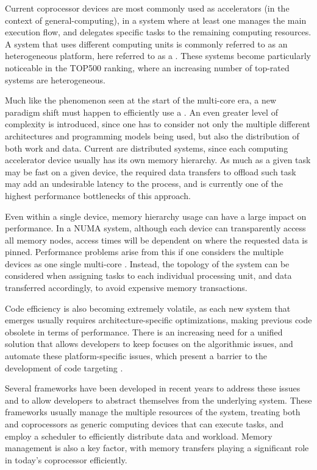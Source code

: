 \documentclass[main.tex]{subfiles}
\begin{document}
Current coprocessor devices are most commonly used as accelerators (in the context of general-computing), in a system where at least one \cpu manages the main execution flow, and delegates specific tasks to the remaining computing resources. A system that uses different computing units is commonly referred to as an heterogeneous platform, here referred to as a \hetplat. These systems become particularly noticeable in the TOP500 ranking, where an increasing number of top-rated systems are heterogeneous.

Much like the phenomenon seen at the start of the multi-core era, a new paradigm shift must happen to efficiently use a \hetplat. An even greater level of complexity is introduced, since one has to consider not only the multiple different architectures and programming models being used, but also the distribution of both work and data. Current \hetplats are distributed systems, since each computing accelerator device usually has its own memory hierarchy. As much as a given task may be fast on a given device, the required data transfers to offload such task may add an undesirable latency to the process, and is currently one of the highest performance bottlenecks of this approach.

Even within a single device, memory hierarchy usage can have a large impact on performance. In a \acs{NUMA} system, although each device can transparently access all memory nodes, access times will be dependent on where the requested data is pinned. Performance problems arise from this if one considers the multiple \cpu devices as one single multi-core \cpu. Instead, the topology of the system can be considered when assigning tasks to each individual processing unit, and data transferred accordingly, to avoid expensive memory transactions.

Code efficiency is also becoming extremely volatile, as each new system that emerges usually requires architecture-specific optimizations, making previous code obsolete in terms of performance. There is an increasing need for a unified solution that allows developers to keep focuses on the algorithmic issues, and automate these platform-specific issues, which present a barrier to the development of code targeting \hetplats.

Several frameworks have been developed in recent years to address these issues and to allow developers to abstract themselves from the underlying system. These frameworks usually manage the multiple resources of the system, treating both \cpus and coprocessors as generic computing devices that can execute tasks, and employ a scheduler to efficiently distribute data and workload. Memory management is also a key factor, with memory transfers playing a significant role in today's coprocessor efficiently.
\end{document}
